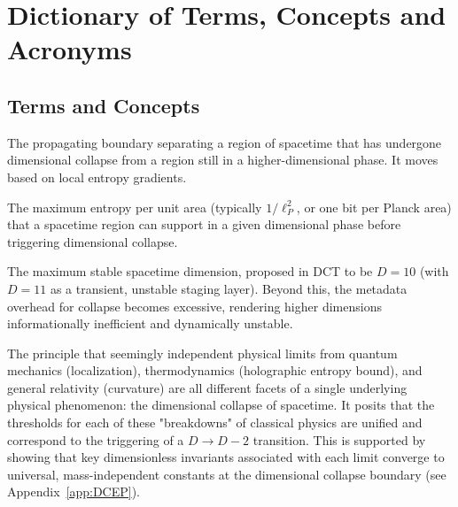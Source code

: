 \documentclass[a4paper, 12pt, oneside]{book}
\numberwithin{equation}{chapter}
\begin{document}
\tableofcontents               
\listoffigures
\listoftables

\chapter*{Dictionary of Terms, Concepts and Acronyms}

\section*{Terms and Concepts}

\medskip
{}\par\nopagebreak
\medskip
The propagating boundary separating a region of spacetime that has undergone dimensional collapse from a region still in a higher-dimensional phase. It moves based on local entropy gradients.
\bigskip

\medskip
{}\par\nopagebreak
\medskip
The maximum entropy per unit area (typically $1/\ell_P^2$, or one bit per Planck area) that a spacetime region can support in a given dimensional phase before triggering dimensional collapse.
\bigskip

\medskip
{}\par\nopagebreak
\medskip
The maximum stable spacetime dimension, proposed in DCT to be $D=10$ (with $D=11$ as a transient, unstable staging layer). Beyond this, the metadata overhead for collapse becomes excessive, rendering higher dimensions informationally inefficient and dynamically unstable.
\bigskip

\medskip
{}\par\nopagebreak
\medskip
The principle that seemingly independent physical limits from quantum mechanics (localization), thermodynamics (holographic entropy bound), and general relativity (curvature) are all different facets of a single underlying physical phenomenon: the dimensional collapse of spacetime. It posits that the thresholds for each of these "breakdowns" of classical physics are unified and correspond to the triggering of a $D \to D-2$ transition. This is supported by showing that key dimensionless invariants associated with each limit converge to universal, mass-independent constants at the dimensional collapse boundary (see Appendix~\ref{app:DCEP}).
\bigskip
\end{document}
